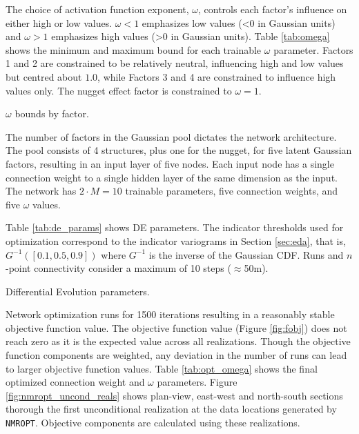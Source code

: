 The choice of activation function exponent, $\omega$, controls each factor's influence on either high or low values. $\omega < 1$ emphasizes low values (<0 in Gaussian units) and $\omega > 1$ emphasizes high values (>0 in Gaussian units). Table \ref{tab:omega} shows the minimum and maximum bound for each trainable $\omega$ parameter. Factors 1 and 2 are constrained to be relatively neutral, influencing high and low values but centred about $1.0$, while Factors 3 and 4 are constrained to influence high values only. The nugget effect factor is constrained to $\omega=1$.

\begin{table}[!htb]
    \centering
    \caption{$\omega$ bounds by factor.}
    \resizebox{0.9\width}{!}{}
    \label{tab:omega}
\end{table}

The number of factors in the Gaussian pool dictates the network architecture. The pool consists of 4 structures, plus one for the nugget, for five latent Gaussian factors, resulting in an input layer of five nodes. Each input node has a single connection weight to a single hidden layer of the same dimension as the input. The network has $2 \cdot M = 10$ trainable parameters, five connection weights, and five $\omega$ values.

Table \ref{tab:de_params} shows \gls{DE} parameters. The indicator thresholds used for optimization correspond to the indicator variograms in Section \ref{sec:eda}, that is, $G^{-1}([0.1, 0.5, 0.9])$ where $G^{-1}$ is the inverse of the Gaussian \gls{CDF}. Runs and $n$-point connectivity consider a maximum of 10 steps ($\approx$50m).

\begin{table}[!htb]
    \centering
    \caption{Differential Evolution parameters.}
    \resizebox{0.9\width}{!}{}
    \label{tab:de_params}
\end{table}

Network optimization runs for 1500 iterations resulting in a reasonably stable objective function value. The objective function value (Figure \ref{fig:fobj}) does not reach zero as it is the expected value across all realizations. Though the objective function components are weighted, any deviation in the number of runs can lead to larger objective function values. Table \ref{tab:opt_omega} shows the final optimized connection weight and  $\omega$ parameters. Figure \ref{fig:nmropt_uncond_reals} shows plan-view, east-west and north-south sections thorough the first unconditional realization at the data locations generated by \texttt{NMROPT}. Objective components are calculated using these realizations.

